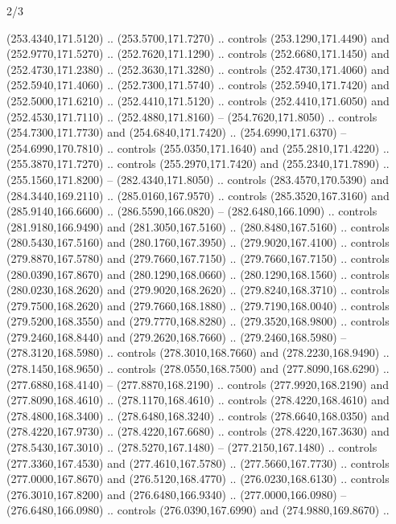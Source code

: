 \begin{flagdescription}{2/3}
\begin{scope}[xshift=0.5\flaglength,yshift=0.5\flagwidth,scale=\flagwidth/259.2]
\begin{scope}[y=0.8pt, x=0.8pt, yscale=-1,shift={(-243,-162)}]
      (253.4340,171.5120) .. (253.5700,171.7270) .. controls (253.1290,171.4490) and
      (252.9770,171.5270) .. (252.7620,171.1290) .. controls (252.6680,171.1450) and
      (252.4730,171.2380) .. (252.3630,171.3280) .. controls (252.4730,171.4060) and
      (252.5940,171.4060) .. (252.7300,171.5740) .. controls (252.5940,171.7420) and
      (252.5000,171.6210) .. (252.4410,171.5120) .. controls (252.4410,171.6050) and
      (252.4530,171.7110) .. (252.4880,171.8160) -- (254.7620,171.8050) .. controls
      (254.7300,171.7730) and (254.6840,171.7420) .. (254.6990,171.6370) --
      (254.6990,170.7810) .. controls (255.0350,171.1640) and (255.2810,171.4220) ..
      (255.3870,171.7270) .. controls (255.2970,171.7420) and (255.2340,171.7890) ..
      (255.1560,171.8200) -- (282.4340,171.8050) .. controls (283.4570,170.5390) and
      (284.3440,169.2110) .. (285.0160,167.9570) .. controls (285.3520,167.3160) and
      (285.9140,166.6600) .. (286.5590,166.0820) -- (282.6480,166.1090) .. controls
      (281.9180,166.9490) and (281.3050,167.5160) .. (280.8480,167.5160) .. controls
      (280.5430,167.5160) and (280.1760,167.3950) .. (279.9020,167.4100) .. controls
      (279.8870,167.5780) and (279.7660,167.7150) .. (279.7660,167.7150) .. controls
      (280.0390,167.8670) and (280.1290,168.0660) .. (280.1290,168.1560) .. controls
      (280.0230,168.2620) and (279.9020,168.2620) .. (279.8240,168.3710) .. controls
      (279.7500,168.2620) and (279.7660,168.1880) .. (279.7190,168.0040) .. controls
      (279.5200,168.3550) and (279.7770,168.8280) .. (279.3520,168.9800) .. controls
      (279.2460,168.8440) and (279.2620,168.7660) .. (279.2460,168.5980) --
      (278.3120,168.5980) .. controls (278.3010,168.7660) and (278.2230,168.9490) ..
      (278.1450,168.9650) .. controls (278.0550,168.7500) and (277.8090,168.6290) ..
      (277.6880,168.4140) -- (277.8870,168.2190) .. controls (277.9920,168.2190) and
      (277.8090,168.4610) .. (278.1170,168.4610) .. controls (278.4220,168.4610) and
      (278.4800,168.3400) .. (278.6480,168.3240) .. controls (278.6640,168.0350) and
      (278.4220,167.9730) .. (278.4220,167.6680) .. controls (278.4220,167.3630) and
      (278.5430,167.3010) .. (278.5270,167.1480) -- (277.2150,167.1480) .. controls
      (277.3360,167.4530) and (277.4610,167.5780) .. (277.5660,167.7730) .. controls
      (277.0000,167.8670) and (276.5120,168.4770) .. (276.0230,168.6130) .. controls
      (276.3010,167.8200) and (276.6480,166.9340) .. (277.0000,166.0980) --
      (276.6480,166.0980) .. controls (276.0390,167.6990) and (274.9880,169.8670) ..

\end{scope}
\end{scope}
\end{flagdescription}
